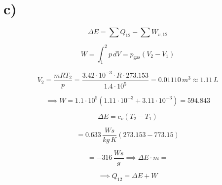 

\section*{c)}

\[
\Delta E = \sum Q_{12} - \sum W_{v,12}
\]

\[
W = \int_{1}^{2} p \, dV = p_{\text{gas}} (V_2 - V_1)
\]

\[
V_2 = \frac{mRT_2}{p} = \frac{3.42 \cdot 10^{-3} \cdot R \cdot 273.153}{1.4 \cdot 10^5} = 0.01110 \, m^3 \approx 1.11 \, L
\]

\[
\implies W = 1.1 \cdot 10^5 \left(1.11 \cdot 10^{-3} + 3.11 \cdot 10^{-3}\right) = 594.843
\]

\[
\Delta E = c_v (T_2 - T_1)
\]

\[
= 0.633 \, \frac{Ws}{kg \, K} \left(273.153 - 773.15\right)
\]

\[
= -316 \, \frac{Ws}{g} \implies \Delta E \cdot m =
\]

\[
\implies Q_{12} = \Delta E + W
\]